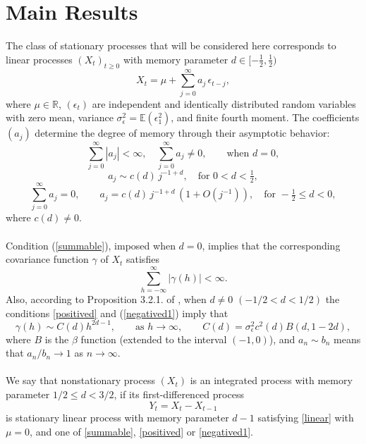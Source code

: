 \documentclass[12pt]{article}
\numberwithin{equation}{section}
\begin{document}
\section{Main Results}\label{sec:2}
The class of stationary processes that will be considered here corresponds to linear processes \((X_t)_{t \ge 0}\)  with memory parameter \(d \in [-\tfrac{1}{2}, \tfrac{1}{2})\)   
\begin{equation}\label{linear}
X_t =\mu+\sum_{j=0}^\infty a_j\, \epsilon_{t-j},
\end{equation}
where $\mu\in\mathbb{R}$, \((\epsilon_t)\) are independent and identically distributed random variables with zero mean, variance \(\sigma_\epsilon^2 = \mathbb{E}(\epsilon_1^2)\), and finite fourth moment. 
The coefficients \((a_j)\) determine the degree of memory through their asymptotic behavior:
\begin{equation}\label{summable}
\sum_{j=0}^\infty |a_j| < \infty, \quad \sum_{j=0}^\infty a_j\neq0,\qquad\text{when } d = 0,
\end{equation}
\begin{equation}\label{positived}
a_j \sim c(d)\, j^{-1+d}, \quad \text{for } 0 < d < \tfrac{1}{2},
\end{equation}
\begin{equation}\label{negatived1}
\sum_{j=0}^\infty a_j = 0, \qquad 
a_j = c(d)\, j^{-1+d}\,(1 + O(j^{-1})), \quad \text{for } -\tfrac{1}{2} \le d < 0,
\end{equation}
where \(c(d) \neq 0\).  \\\\
    Condition (\ref{summable}), imposed when $d=0$, implies that the corresponding covariance function $\gamma$ of $X_t$ satisfies
 $$
 \sum_{h=-\infty}^\infty\vert\gamma(h)\vert<\infty.
 $$
 Also, according to Proposition 3.2.1. of \cite{MR2977317}, when $d\neq 0$ $(-1/2<d<1/2)$  the conditions \eqref{positived} and   (\ref{negatived1}) imply that
 \begin{equation}\label{gammad}
\gamma(h)\sim C(d) h^{2d-1},\qquad\textrm{as }h\to\infty,\qquad C(d)=\sigma^2_\epsilon c^2(d)B(d,1-2d),
 \end{equation}
 where $B$ is the $\beta$ function (extended to the interval $(-1,0)$), and 
 $a_n\sim b_n$ means that $a_n/b_n\to1$ as $n\to\infty$.\\\\
We say that nonstationary process \((X_t)\) is an integrated process with memory parameter \(1/2 \le d < 3/2\), if its first-differenced process
\[
Y_t = X_t - X_{t-1}
\]
is stationary linear  process with memory parameter \(d - 1\) satisfying \eqref{linear} with $\mu=0$, and  one of \eqref{summable}, \eqref{positived} or \eqref{negatived1}.
\end{document}
